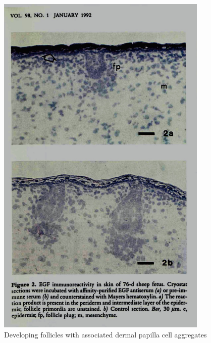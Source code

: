 %

\begin{figure}[h]
  \centering
   \includegraphics[width=0.9\textwidth]{image1.jpg}
  \caption{Developing follicles with associated dermal papilla cell aggregates}
  \label{fig:dpcagg}
\end{figure}

%

